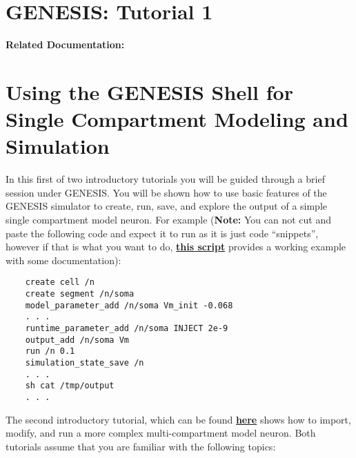 \documentclass[12pt]{article}
\begin{document}
\section*{GENESIS: Tutorial 1}

{\bf Related Documentation:}

\section*{Using the GENESIS Shell for\\Single Compartment Modeling and Simulation}

In this first of two introductory tutorials you will be guided through a brief session under GENESIS. You will be shown how to use basic features of the GENESIS simulator to create, run, save, and explore the output of a simple single compartment model neuron. For example ({\bf Note:} You can not cut and paste the following code and expect it to run as it is just code ``snippets'', however if that is what you want to do, \href{../example-script1/example-script1.tex}{\bf this script} provides a working example with some documentation):

\begin{verbatim}
    create cell /n
    create segment /n/soma
    model_parameter_add /n/soma Vm_init -0.068
    . . .
    runtime_parameter_add /n/soma INJECT 2e-9
    output_add /n/soma Vm
    run /n 0.1
    simulation_state_save /n
    . . . 
    sh cat /tmp/output
    . . . 
\end{verbatim}
The second introductory tutorial, which can be found \href{../tutorial2/tutorial2.tex}{\bf here} shows how to import, modify, and run a more complex multi-compartment model neuron. Both tutorials assume that you are familiar with the following topics:
\end{document}
